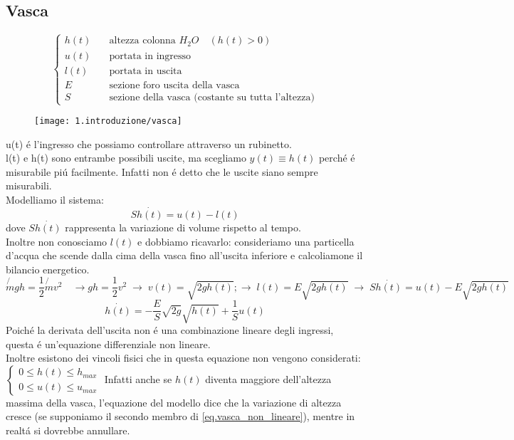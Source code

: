 \documentclass[../main.tex]{subfiles}
\begin{document}
	\subsection{Vasca}
		\[
			\begin{cases}
				h(t) & \quad \text{altezza colonna $H_{2}O$} \quad (h(t)>0)\\
				u(t) & \quad \text{portata in ingresso}\\
				l(t) & \quad \text{portata in uscita}\\
				E & \quad \text{sezione foro uscita della vasca}\\
				S & \quad \text{sezione della vasca (costante su tutta l'altezza)}
			\end{cases}
		\]
		\begin{figure}[h!]
			\centering
			\texttt{[image: 1.introduzione/vasca]}
		\end{figure}
		u(t) \'e l'ingresso che possiamo controllare attraverso un rubinetto.\\
		l(t) e h(t) sono entrambe possibili uscite, ma scegliamo $y(t) \equiv h(t)$ perch\'e \'e misurabile pi\'u facilmente. Infatti non \'e detto che le uscite siano sempre misurabili.\\
		Modelliamo il sistema:
		\begin{equation}
			S \dot{h(t)} = u(t) - l(t)
		\end{equation}
		dove $S \dot{h(t)}$ rappresenta la variazione di volume rispetto al tempo.\\
		Inoltre non conosciamo $l(t)$ e dobbiamo ricavarlo: consideriamo una particella d'acqua che scende dalla cima della vasca fino all'uscita inferiore e calcoliamone il bilancio energetico.
		\[
			\not{m} gh = \frac{1}{2} \not{m} v^2 \quad \rightarrow
			gh = \frac{1}{2} v^2 \; \rightarrow \;
			v(t) = \sqrt{2gh(t)} ; \rightarrow \;
			l(t) = E \sqrt{2gh(t)} \; \rightarrow \;
			S \dot{h(t)} = u(t) - E \sqrt{2gh(t)}
		\]
		\begin{equation} \label{eq.vasca_non_lineare}
			\dot{h(t)} = - \frac{E}{S} \sqrt{2g} \sqrt{h(t)} + \frac{1}{S} u(t)
		\end{equation}
		Poich\'e la derivata dell'uscita non \'e una combinazione lineare degli ingressi, questa \'e un'equazione differenziale non lineare.\\
		Inoltre esistono dei vincoli fisici che in questa equazione non vengono considerati: 
		\(
			\begin{cases}
				0 \leq h(t) \leq h_{max}\\
				0 \leq u(t) \leq u_{max}
			\end{cases}
		\)
		Infatti anche se $h(t)$ diventa maggiore dell'altezza massima della vasca, l'equazione del modello dice che la variazione di altezza cresce (se supponiamo il secondo membro di \ref{eq.vasca_non_lineare}), mentre in realt\'a si dovrebbe annullare.
		
\end{document}
